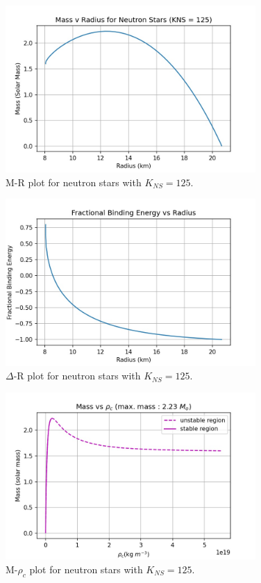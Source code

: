 \documentclass[a4paper]{article}
\begin{document}
\begin{enumerate}[label=(\alph*)]
\begin{enumerate}[label=(\alph*)]
        \begin{figure}[H] 
        \centering
        \includegraphics[width=0.85\textwidth]{NS_DatvPrd_125.jpg}
        \caption{M-R plot for neutron stars with $K_{NS} = 125$.}
        \end{figure} 
        
        \begin{figure}[H] 
        \centering
        \includegraphics[width=0.85\textwidth]{NS_FBE_125.jpg}
        \caption{$\Delta$-R plot for neutron stars with $K_{NS} = 125$.}
        \end{figure} 
        
        
        \begin{figure}[H] 
        \centering
        \includegraphics[width=0.85\textwidth]{NS_rho_125.jpg}
        \caption{M-$\rho_{c}$ plot for neutron stars with $K_{NS} = 125$.}
        \end{figure} 
        

\end{enumerate}
\end{enumerate}
\end{document}
